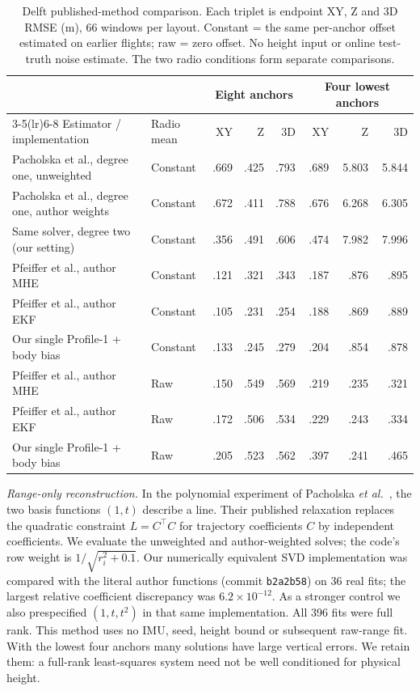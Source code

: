 \documentclass[conference,letterpaper,10pt]{IEEEtran}
\begin{document}
\begin{table}[t]
\caption{Delft published-method comparison. Each triplet is endpoint XY, Z and 3D RMSE (m), 66 windows per layout. Constant = the same per-anchor offset estimated on earlier flights; raw = zero offset. No height input or online test-truth noise estimate. The two radio conditions form separate comparisons.}
\label{tab:published}\centering\small
\begin{tabular}{llrrrrrr}
\toprule
&&\multicolumn{3}{c}{Eight anchors}&\multicolumn{3}{c}{Four lowest anchors}\\
\cmidrule(lr){3-5}\cmidrule(lr){6-8}
Estimator / implementation&Radio mean&XY&Z&3D&XY&Z&3D\\\midrule
Pacholska et al., degree one, unweighted&Constant&.669&.425&.793&.689&5.803&5.844\\
Pacholska et al., degree one, author weights&Constant&.672&.411&.788&.676&6.268&6.305\\
Same solver, degree two (our setting)&Constant&.356&.491&.606&.474&7.982&7.996\\
Pfeiffer et al., author MHE&Constant&.121&.321&.343&.187&.876&.895\\
Pfeiffer et al., author EKF&Constant&.105&.231&.254&.188&.869&.889\\
Our single Profile-1 + body bias&Constant&.133&.245&.279&.204&.854&.878\\
\midrule
Pfeiffer et al., author MHE&Raw&.150&.549&.569&.219&.235&.321\\
Pfeiffer et al., author EKF&Raw&.172&.506&.534&.229&.243&.334\\
Our single Profile-1 + body bias&Raw&.205&.523&.562&.397&.241&.465\\
\bottomrule\end{tabular}
\end{table}

\emph{Range-only reconstruction.} In the polynomial experiment of Pacholska \emph{et al.}~\cite{pacholska}, the two basis functions $(1,t)$ describe a line. Their published relaxation replaces the quadratic constraint $L=C^\top C$ for trajectory coefficients $C$ by independent coefficients. We evaluate the unweighted and author-weighted solves; the code's row weight is $1/\sqrt{r_i^2+0.1}$. Our numerically equivalent SVD implementation was compared with the literal author functions (commit \texttt{b2a2b58}) on 36 real fits; the largest relative coefficient discrepancy was $6.2\times10^{-12}$. As a stronger control we also prespecified $(1,t,t^2)$ in that same implementation. All 396 fits were full rank. This method uses no IMU, seed, height bound or subsequent raw-range fit. With the lowest four anchors many solutions have large vertical errors. We retain them: a full-rank least-squares system need not be well conditioned for physical height.
\end{document}
